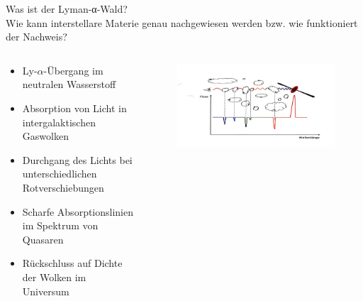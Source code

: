   \begin{frame}{Was ist der Lyman-α-Wald?\\
    Wie kann interstellare Materie genau nachgewiesen werden bzw. wie funktioniert der Nachweis?}
    \begin{columns}
   \begin{column}{0.5\textwidth}
    \begin{itemize}
      \setlength\itemsep{2em}
      \item Ly-$\alpha$-Übergang im neutralen Wasserstoff
      \item Absorption von Licht in intergalaktischen Gaswolken
      \item Durchgang des Lichts bei unterschiedlichen Rotverschiebungen
      \item Scharfe Absorptionslinien im Spektrum von Quasaren
      \item Rückschluss auf Dichte der Wolken im Universum
     \end{itemize}
  \vspace{2em}
  \end{column}
  \begin{column}{0.5\textwidth}
  \begin{figure}
    \centering
    \includegraphics[width=\textwidth]{images/lawald.png}
  \end{figure}
  \end{column}
    \end{columns}
  \end{frame}

